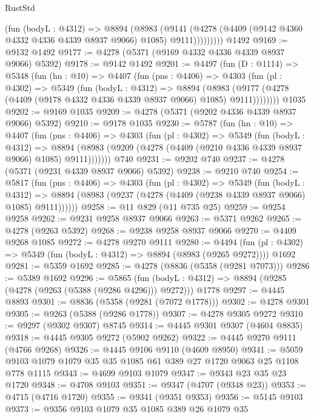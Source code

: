 \begin{lexlean}{RustStd}
\begin{coremodule}
{\begin{coremodule}
{{{{{{{{{{{{{{{{{{{{{{{{{{{{{{{{{{{              (fun (bodyL : @4312) =>
              @8894
                (@8983
                  (@9141
                    (@4278 (@4409 (@9142 @4360 @4332 @4336 @4339 @8937 @9066) @1085) @9111)))))))))
    @1492
@9169 := @9132 @1492
@9177 := @4278 (@5371 (@9169 @4332 @4336 @4339 @8937 @9066) @5392)
@9178 := @9142 @1492
@9201 := @4497
    (fun (D : @1114) =>
    @5348
      (fun (hn : @10) =>
      @4407
        (fun (pns : @4406) =>
        @4303
          (fun (pl : @4302) =>
          @5349
            (fun (bodyL : @4312) =>
            @8894
              (@8983 (@9177 (@4278 (@4409 (@9178 @4332 @4336 @4339 @8937 @9066) @1085) @9111))))))))
    @1035
@9202 := @9169 @1035
@9209 := @4278 (@5371 (@9202 @4336 @4339 @8937 @9066) @5392)
@9210 := @9178 @1035
@9230 := @5787
    (fun (hn : @10) =>
    @4407
      (fun (pns : @4406) =>
      @4303
        (fun (pl : @4302) =>
        @5349
          (fun (bodyL : @4312) =>
          @8894 (@8983 (@9209 (@4278 (@4409 (@9210 @4336 @4339 @8937 @9066) @1085) @9111)))))))
    @740
@9231 := @9202 @740
@9237 := @4278 (@5371 (@9231 @4339 @8937 @9066) @5392)
@9238 := @9210 @740
@9254 := @5817
    (fun (pns : @4406) =>
    @4303
      (fun (pl : @4302) =>
      @5349
        (fun (bodyL : @4312) =>
        @8894 (@8983 (@9237 (@4278 (@4409 (@9238 @4339 @8937 @9066) @1085) @9111))))))
@9258 := @11 @829 (@11 @735 @25)
@9259 := @9254 @9258
@9262 := @9231 @9258 @8937 @9066
@9263 := @5371 @9262
@9265 := @4278 (@9263 @5392)
@9268 := @9238 @9258 @8937 @9066
@9270 := @4409 @9268 @1085
@9272 := @4278 @9270 @9111
@9280 := @4494
    (fun (pl : @4302) => @5349 (fun (bodyL : @4312) => @8894 (@8983 (@9265 @9272))))
    @1692
@9281 := @5359 @1692
@9285 := @4278 (@8836 (@5358 (@9281 @7073)))
@9286 := @5389 @1692
@9296 := @5865
    (fun (bodyL : @4312) => @8894 (@9285 (@4278 (@9263 (@5388 (@9286 @4296))) @9272)))
    @1778
@9297 := @4445 @8893
@9301 := @8836 (@5358 (@9281 (@7072 @1778)))
@9302 := @4278 @9301
@9305 := @9263 (@5388 (@9286 @1778))
@9307 := @4278 @9305 @9272
@9310 := @9297 (@9302 @9307) @8745
@9314 := @4445 @9301 @9307 (@4604 @8835)
@9318 := @4445 @9305 @9272 (@5902 @9262)
@9322 := @4445 @9270 @9111 (@4766 @9268)
@9326 := @4445 @9106 @9110 (@4609 @8950)
@9341 := @5059 @9103 @1079 @1079 @35 @35 @1085 @61 @389 @27 @1720 @9063 @25 @1108 @778 @1115
@9343 := @4699 @9103 @1079
@9347 := @9343 @23 @35 @23 @1720
@9348 := @4708 @9103
@9351 := @9347 (@4707 (@9348 @23))
@9353 := @4715 (@4716 @1720)
@9355 := @9341 (@9351 @9353)
@9356 := @5145 @9103
@9373 := @9356
    @9103
    @1079
    @35
    @1085
    @389
    @26
    @1079
    @35
}}}}}}}}}}}}}}}}}}}}}}}}}}}}}}}}}}}
\end{coremodule}}
\end{coremodule}
\end{lexlean}
